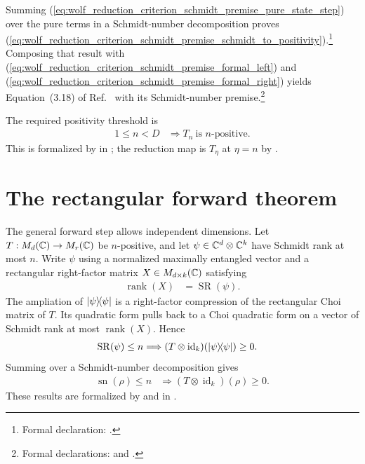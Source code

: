 \documentclass{article}
\begin{document}
Summing
(\ref{eq:wolf_reduction_criterion_schmidt_premise_pure_state_step}) over the
pure terms in a Schmidt-number decomposition proves
(\ref{eq:wolf_reduction_criterion_schmidt_premise_schmidt_to_positivity}).\footnote{Formal
declaration:
    .}
Composing that result with
(\ref{eq:wolf_reduction_criterion_schmidt_premise_formal_left}) and
(\ref{eq:wolf_reduction_criterion_schmidt_premise_formal_right}) yields
Equation~(3.18) of Ref.~\cite{Wolf2012Quantum} with its Schmidt-number
premise.\footnote{Formal declarations:
     and
    .}

The required positivity threshold is
\begin{align}
    1\leq n<D
        &\Longrightarrow T_n\ \text{is $n$-positive}.
    \label{eq:wolf_reduction_criterion_schmidt_premise_positivity_threshold}
\end{align}
This is formalized by
 in
; the reduction map is
$T_\eta$ at $\eta=n$ by .

\section{The rectangular forward theorem}

The general forward step allows independent dimensions. Let
$T:M_d(\mathbb{C})\to M_r(\mathbb{C})$ be $n$-positive, and let
$\psi\in\mathbb{C}^d\otimes\mathbb{C}^k$ have Schmidt rank at most $n$. Write $\psi$ using a
normalized maximally entangled vector and a rectangular right-factor matrix
$X\in M_{d\times k}(\mathbb{C})$ satisfying
\begin{align}
    \operatorname{rank}(X)
        &=\operatorname{SR}(\psi).
    \label{eq:wolf_reduction_criterion_schmidt_premise_rectangular_rank}
\end{align}
The ampliation of $|\psi\rangle\!\langle \psi|$ is a right-factor compression of the
rectangular Choi matrix of $T$. Its quadratic form pulls back to a Choi
quadratic form on a vector of Schmidt rank at most
$\operatorname{rank}(X)$. Hence
\begin{align}
    \operatorname{SR}(\psi)\leq n
        &\Longrightarrow
        (T\otimes\operatorname{id}_k)
        \!\left(|\psi\rangle\!\langle \psi|\right)\geq0.
    \label{eq:wolf_reduction_criterion_schmidt_premise_rectangular_pure_step}
\end{align}
Summing over a Schmidt-number decomposition gives
\begin{align}
    \operatorname{sn}(\rho)\leq n
        &\Longrightarrow
        (T\otimes\operatorname{id}_k)(\rho)\geq0.
    \label{eq:wolf_reduction_criterion_schmidt_premise_rectangular_mixed_step}
\end{align}
These results are formalized by
 and
 in
.
\end{document}
